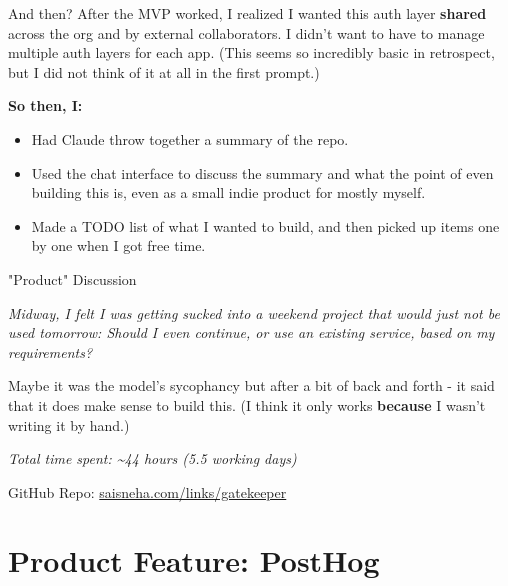\documentclass{beamer}
\begin{document}
\begin{frame}{And then?}
    After the MVP worked, I realized I wanted this auth layer \textbf{shared} across the org and by external collaborators. I didn't want to have to manage multiple auth layers for each app. (This seems so incredibly basic in retrospect, but I did not think of it at all in the first prompt.)

    \pause
    \vspace{1em}
    \textbf{So then, I:}
    \begin{itemize}[<+->]
        \item Had Claude throw together a summary of the repo.
        \item Used the chat interface to discuss the summary and what the point of even building this is, even as a small indie product for mostly myself.
        \item Made a TODO list of what I wanted to build, and then picked up items one by one when I got free time.
    \end{itemize}

\end{frame}

\begin{frame}{"Product" Discussion}

    \vspace{0.5em}
    \textit{Midway, I felt I was getting sucked into a weekend project that would just not be used tomorrow: Should I even continue, or use an existing service, based on my requirements?}

    \vspace{1em}
    \small
    Maybe it was the model's sycophancy but after a bit of back and forth - it said that it does make sense to build this. (I think it only works \textbf{because} I wasn't writing it by hand.)

    \textit{Total time spent: \textasciitilde44 hours (5.5 working days)}

    \vspace{1em}
    GitHub Repo: \url{saisneha.com/links/gatekeeper}

\end{frame}



\section{Product Feature: PostHog}
\end{document}
